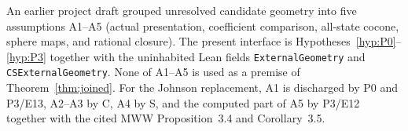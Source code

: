 \begin{remark}\label{sec:retired-assumptions}
An earlier project draft grouped unresolved candidate geometry into five
assumptions A1--A5 (actual presentation, coefficient comparison, all-state
cocone, sphere maps, and rational closure).  The present interface is
Hypotheses~\ref{hyp:P0}--\ref{hyp:P3} together with the uninhabited Lean
fields \texttt{ExternalGeometry} and \texttt{CSExternalGeometry}.  None of
A1--A5 is used as a premise of Theorem~\ref{thm:joined}.  For the Johnson
replacement, A1 is discharged by P0 and P3/E13, A2--A3 by C, A4 by S, and
the computed part of A5 by P3/E12 together with the cited MWW
Proposition~3.4 and Corollary~3.5.
\end{remark}

